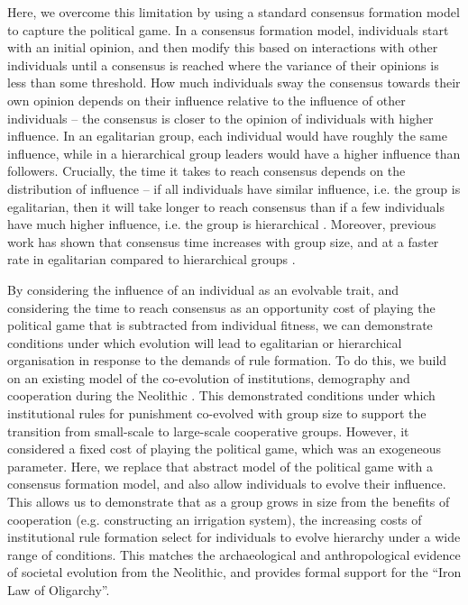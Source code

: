 \documentclass{rstb}
\begin{document}
\begin{linenumbers}
Here, we overcome this limitation by using a standard consensus formation model \cite{Gavrilets:2016:a,Perret:2021:a} to capture the political game. In a consensus formation model, individuals start with an initial opinion, and then modify this based on interactions with other individuals until a consensus is reached where the variance of their opinions is less than some threshold. How much individuals sway the consensus towards their own opinion depends on their influence relative to the influence of other individuals -- the consensus is closer to the opinion of individuals with higher influence. In an egalitarian group, each individual would have roughly the same influence, while in a hierarchical group leaders would have a higher influence than followers. Crucially, the time it takes to reach consensus depends on the distribution of influence -- if all individuals have similar influence, i.e. the group is egalitarian, then it will take longer to reach consensus than if a few individuals have much higher influence, i.e. the group is hierarchical \cite{Gavrilets:2016:a,Perret:2020:a}. Moreover, previous work has shown that consensus time increases with group size, and at a faster rate in egalitarian compared to hierarchical groups \cite{Perret:2020:a}.

By considering the influence of an individual as an evolvable trait, and considering the time to reach consensus as an opportunity cost of playing the political game that is subtracted from individual fitness, we can demonstrate conditions under which evolution will lead to egalitarian or hierarchical organisation in response to the demands of rule formation. To do this, we build on an existing model of the co-evolution of institutions, demography and cooperation during the Neolithic \cite{Powers:2013:a}. This demonstrated conditions under which institutional rules for punishment co-evolved with group size to support the transition from small-scale to large-scale cooperative groups. However, it considered a fixed cost of playing the political game, which was an exogeneous parameter. Here, we replace that abstract model of the political game with a consensus formation model, and also allow individuals to evolve their influence. This allows us to demonstrate that as a group grows in size from the benefits of cooperation (e.g. constructing an irrigation system), the increasing costs of institutional rule formation select for individuals to evolve hierarchy under a wide range of conditions. This matches the archaeological and anthropological evidence of societal evolution from the Neolithic, and provides formal support for the ``Iron Law of Oligarchy''.


\end{linenumbers}
\end{document}
